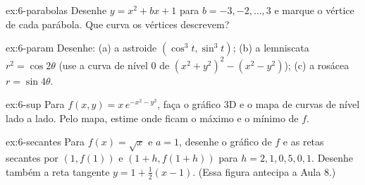 \begin{exercicio}{ex:6-parabolas}
Desenhe $y=x^2+bx+1$ para $b=-3,-2,\dots,3$ e marque o vértice de cada parábola. Que curva os vértices descrevem?
\end{exercicio}

\begin{exercicio}{ex:6-param}
Desenhe: (a) a astroide $(\cos^3t, \sin^3t)$; (b) a lemniscata $r^2=\cos 2\theta$ (use a curva de nível 0 de
$(x^2+y^2)^2-(x^2-y^2)$); (c) a rosácea $r=\sin 4\theta$.
\end{exercicio}

\begin{exercicio}{ex:6-sup}
Para $f(x,y)=x\,e^{-x^2-y^2}$, faça o gráfico 3D e o mapa de curvas de nível lado a lado. Pelo mapa, estime onde
ficam o máximo e o mínimo de $f$.
\end{exercicio}

\begin{exercicio}{ex:6-secantes}
Para $f(x)=\sqrt{x}$ e $a=1$, desenhe o gráfico de $f$ e as retas secantes por $(1, f(1))$ e $(1+h, f(1+h))$ para
$h=2, 1, 0{,}5, 0{,}1$. Desenhe também a reta tangente $y=1+\frac{1}{2}(x-1)$. (Essa figura antecipa a Aula 8.)
\end{exercicio}
